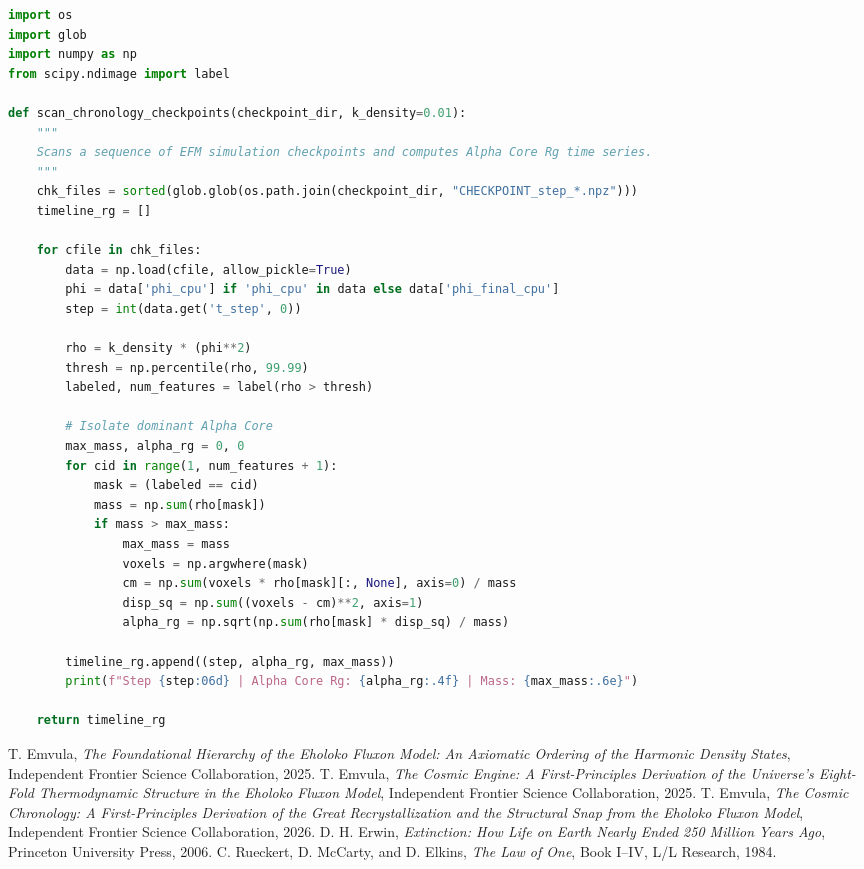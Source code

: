 \documentclass[11pt, twoside]{article}
\begin{document}
\begin{lstlisting}[language=Python, caption={Lagrangian Stability Scanner from Cosmic\_Chronology\_Validation.ipynb.}]
import os
import glob
import numpy as np
from scipy.ndimage import label

def scan_chronology_checkpoints(checkpoint_dir, k_density=0.01):
    """
    Scans a sequence of EFM simulation checkpoints and computes Alpha Core Rg time series.
    """
    chk_files = sorted(glob.glob(os.path.join(checkpoint_dir, "CHECKPOINT_step_*.npz")))
    timeline_rg = []
    
    for cfile in chk_files:
        data = np.load(cfile, allow_pickle=True)
        phi = data['phi_cpu'] if 'phi_cpu' in data else data['phi_final_cpu']
        step = int(data.get('t_step', 0))
        
        rho = k_density * (phi**2)
        thresh = np.percentile(rho, 99.99)
        labeled, num_features = label(rho > thresh)
        
        # Isolate dominant Alpha Core
        max_mass, alpha_rg = 0, 0
        for cid in range(1, num_features + 1):
            mask = (labeled == cid)
            mass = np.sum(rho[mask])
            if mass > max_mass:
                max_mass = mass
                voxels = np.argwhere(mask)
                cm = np.sum(voxels * rho[mask][:, None], axis=0) / mass
                disp_sq = np.sum((voxels - cm)**2, axis=1)
                alpha_rg = np.sqrt(np.sum(rho[mask] * disp_sq) / mass)
                
        timeline_rg.append((step, alpha_rg, max_mass))
        print(f"Step {step:06d} | Alpha Core Rg: {alpha_rg:.4f} | Mass: {max_mass:.6e}")
        
    return timeline_rg
\end{lstlisting}


\begin{thebibliography}{9}
 T. Emvula, \textit{The Foundational Hierarchy of the Eholoko Fluxon Model: An Axiomatic Ordering of the Harmonic Density States}, Independent Frontier Science Collaboration, 2025.
 T. Emvula, \textit{The Cosmic Engine: A First-Principles Derivation of the Universe's Eight-Fold Thermodynamic Structure in the Eholoko Fluxon Model}, Independent Frontier Science Collaboration, 2025.
 T. Emvula, \textit{The Cosmic Chronology: A First-Principles Derivation of the Great Recrystallization and the Structural Snap from the Eholoko Fluxon Model}, Independent Frontier Science Collaboration, 2026.
 D. H. Erwin, \textit{Extinction: How Life on Earth Nearly Ended 250 Million Years Ago}, Princeton University Press, 2006.
 C. Rueckert, D. McCarty, and D. Elkins, \textit{The Law of One}, Book I--IV, L/L Research, 1984.
\end{thebibliography}
\end{document}
